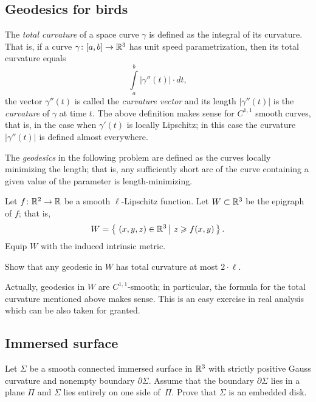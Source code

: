\subsection*{Geodesics for birds}
\label{liberman}

The \emph{total curvature} of a space curve $\gamma$ is defined as the integral of its curvature.
That is, if a curve $\gamma\colon[a,b]\to\mathbb{R}^3$ has unit speed parametrization, 
then its total curvature equals 
\[\int\limits_a^b|\gamma''(t)|\cdot dt,\]
the vector $\gamma''(t)$ is called the \emph{curvature vector} and its length $|\gamma''(t)|$ is the \emph{curvature} of $\gamma$ at time $t$.
The above definition makes sense for $C^{1,1}$ smooth curves,
that is, in the case when $\gamma'(t)$ is locally Lipschitz;
in this case the curvature $|\gamma''(t)|$ is defined almost everywhere.

The \emph{geodesics} in the following problem are defined as the curves locally minimizing the length;
that is, any sufficiently short arc of the curve containing a given value of the parameter is length-minimizing.

\begin{pr}
Let $f\colon\mathbb{R}^2\to\mathbb{R}$ be a smooth $\ell$-Lipschitz function.
Let $W\subset \mathbb{R}^3$ be the epigraph of $f$;
that is,
$$W=\set{(x,y,z)\in\RR^3}{z\ge f(x,y)}.$$
Equip $W$ with the induced intrinsic metric.

Show that any geodesic in $W$ 
 has  total curvature at most $2\cdot\ell$. 
\end{pr}

Actually, geodesics in $W$ are $C^{1,1}$-smooth;
in particular, the formula for the total curvature mentioned above makes sense.
This is an easy exercise in real analysis which can be also taken for granted.


\subsection*{Immersed surface}
\label{Immersed surface}

\begin{pr}
Let $\Sigma$ be a smooth connected immersed surface in $\mathbb{R}^3$ with strictly positive Gauss curvature and nonempty boundary $\partial\Sigma$.
Assume that the boundary $\partial\Sigma$ lies in a plane $\Pi$
and $\Sigma$ lies entirely on one side of~$\Pi$.
Prove that $\Sigma$ is an embedded disk.
\end{pr}

